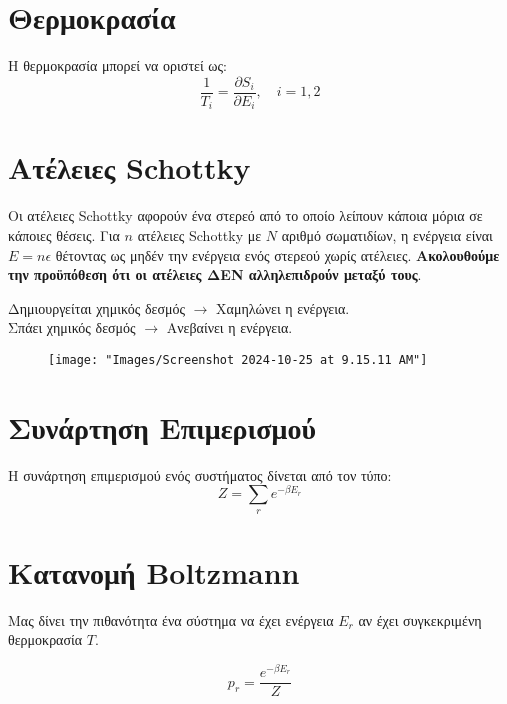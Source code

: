 \documentclass[11pt, oneside]{article}   	%
\newcommand{\note}[1]{
	\begin{tcolorbox}[colback=yellow!5!white,colframe=yellow!75!black,title=\textbf{Σημείωση}]
		\begin{center}
			#1
		\end{center}
	\end{tcolorbox}
}
\begin{document}
\section{Θερμοκρασία}
Η θερμοκρασία μπορεί να οριστεί ως:
\[\frac{1}{T_i}=\frac{\partial S_i}{\partial E_i}, \quad i=1,2\]

\section{Ατέλειες Schottky}
Οι ατέλειες Schottky αφορούν ένα στερεό από το οποίο λείπουν κάποια μόρια σε κάποιες θέσεις. Για $n$ ατέλειες Schottky με $N$ αριθμό σωματιδίων, η ενέργεια είναι $E=n\epsilon$ θέτοντας ως μηδέν την ενέργεια ενός στερεού χωρίς ατέλειες. \textbf{Ακολουθούμε την προϋπόθεση ότι οι ατέλειες ΔΕΝ αλληλεπιδρούν μεταξύ τους}.

\note{Δημιουργείται χημικός δεσμός $\rightarrow$ Χαμηλώνει η ενέργεια. \\
Σπάει χημικός δεσμός $\rightarrow$ Ανεβαίνει η ενέργεια.}
\begin{figure}[H]
	\centering
	\texttt{[image: "Images/Screenshot 2024-10-25 at 9.15.11 AM"]}
	\caption{}
	\label{fig:screenshot-2024-10-25-at-9}
\end{figure}

\section{Συνάρτηση Επιμερισμού}
Η συνάρτηση επιμερισμού ενός συστήματος δίνεται από τον τύπο:
\[Z = \sum_r e^{-\beta E_r}\]

\section{Κατανομή Boltzmann}

Μας δίνει την πιθανότητα ένα σύστημα να έχει ενέργεια $E_r$ αν έχει συγκεκριμένη θερμοκρασία $T$.

\[p_r = \frac{e^{-\beta E_r}}{Z}\]
\end{document}
